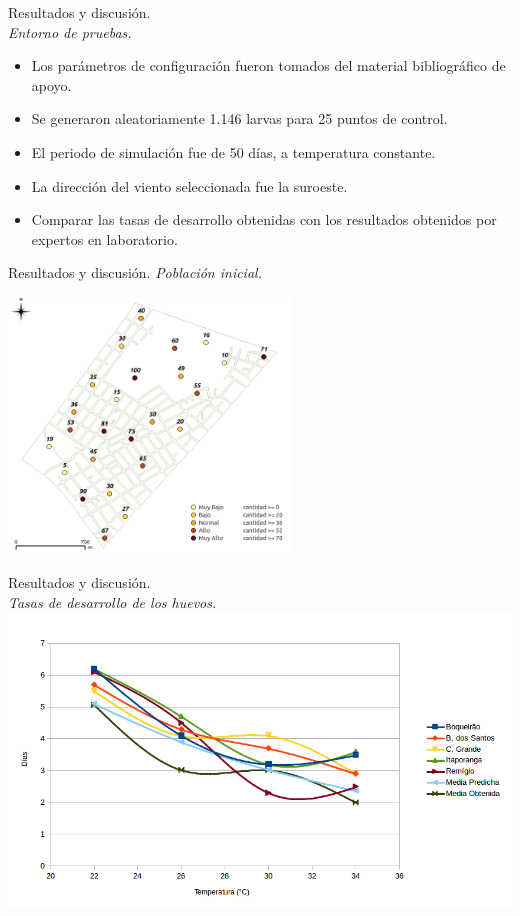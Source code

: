 \begin{frame}[t]{Resultados y discusión.\\\textit{Entorno de pruebas.}}
\begin{itemize}
    \item Los parámetros de configuración fueron tomados del material bibliográfico de apoyo.
    \item Se generaron aleatoriamente 1.146 larvas para 25 puntos de control.
    \item El periodo de simulación fue de 50 días, a temperatura constante.
    \item La dirección del viento seleccionada fue la suroeste.
    \item Comparar las tasas de desarrollo obtenidas con los resultados obtenidos por expertos en laboratorio.
    \end{itemize}
\end{frame}

\begin{frame}[t]{Resultados y discusión. \textit{Población inicial.}}
    \begin{center}
        \includegraphics[width=7.5cm]{./graphics/extension-poblacion.png}
    \end{center}
\end{frame}

\begin{frame}[t]{Resultados y discusión.\\\textit{Tasas de desarrollo de los huevos.}}
    \includegraphics[width=\textwidth]{./graphics/huevos-desarrollo.png}
\end{frame}

